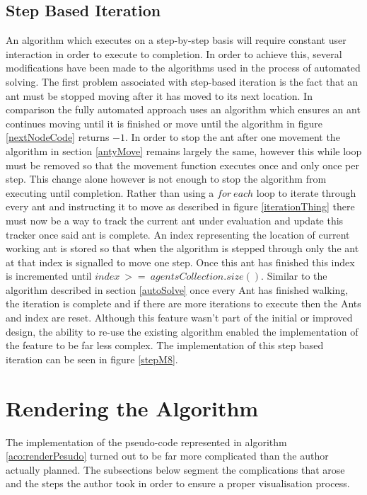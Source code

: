 \subsection{Step Based Iteration}
An algorithm which executes on a step-by-step basis will require constant user interaction in order to execute to completion. In order to achieve this, several modifications have been made to the algorithms used in the process of automated solving. The first problem associated with step-based iteration is the fact that an ant must be stopped moving after it has moved to its next location. In comparison the fully automated approach uses an algorithm which ensures an ant continues moving until it is finished or move until the algorithm in figure \ref{nextNodeCode} returns $-1$. In order to stop the ant after one movement the algorithm in section \ref{antyMove} remains largely the same, however this while loop must be removed so that the movement function executes once and only once per step. This change alone however is not enough to stop the algorithm from executing until completion. Rather than using a $for\ each$ loop to iterate through every ant and instructing it to move as described in figure \ref{iterationThing} there must now be a way to track the current ant under evaluation and update this tracker once said ant is complete. An index representing the location of current working ant is stored so that when the algorithm is stepped through only the ant at that index is signalled to move one step. Once this ant has finished this index is incremented until $index\ >=\ agentsCollection.size()$. Similar to the algorithm described in section \ref{autoSolve} once every Ant has finished walking, the iteration is complete and if there are more iterations to execute then the Ants and index are reset. Although this feature wasn't part of the initial or improved design, the ability to re-use the existing algorithm enabled the implementation of the feature to be far less complex. The implementation of this step based iteration can be seen in figure \ref{stepM8}.

\section{Rendering the Algorithm}

The implementation of the pseudo-code represented in algorithm \ref{aco:renderPesudo} turned out to be far more complicated than the author actually planned. The subsections below segment the complications that arose and the steps the author took in order to ensure a proper visualisation process.

